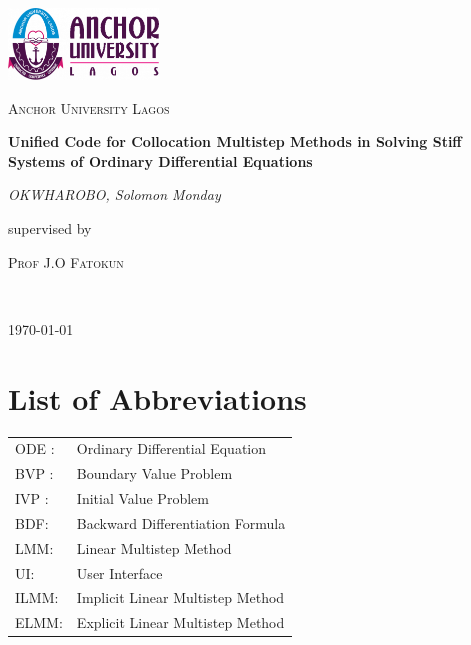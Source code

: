 \documentclass[13pt, a4paper, twoside]{report}
\begin{document}
\begin{titlepage}
   \centering
   \vspace*{1cm}
   \includegraphics[width=0.3\textwidth]{aul_logo.png}\par
   \vspace{1.5cm}
   {\scshape\LARGE Anchor University Lagos \par}
   \vspace{1cm}
   \vspace{1.5cm}
   {\huge\bfseries Unified Code for Collocation Multistep Methods in Solving Stiff Systems of Ordinary Differential Equations\par}
   \vspace{2cm}
   {\Large\itshape OKWHAROBO, Solomon Monday\par}
   \vfill
   supervised by\par
   \textsc{Prof J.O Fatokun}
  
   
    \\
   

   \vfill

   {\large \today\par}
\end{titlepage}

\tableofcontents

\chapter*{List of Abbreviations}
\begin{tabular}{ll}
    ODE : & Ordinary Differential Equation \\
    BVP : & Boundary Value Problem \\
    IVP : & Initial Value Problem \\
    BDF: &Backward Differentiation Formula \\
    LMM: &Linear Multistep Method \\
    UI: &User Interface \\
    ILMM:& Implicit Linear Multistep Method \\
    ELMM: & Explicit Linear Multistep Method
\end{tabular}








 
\end{document}
